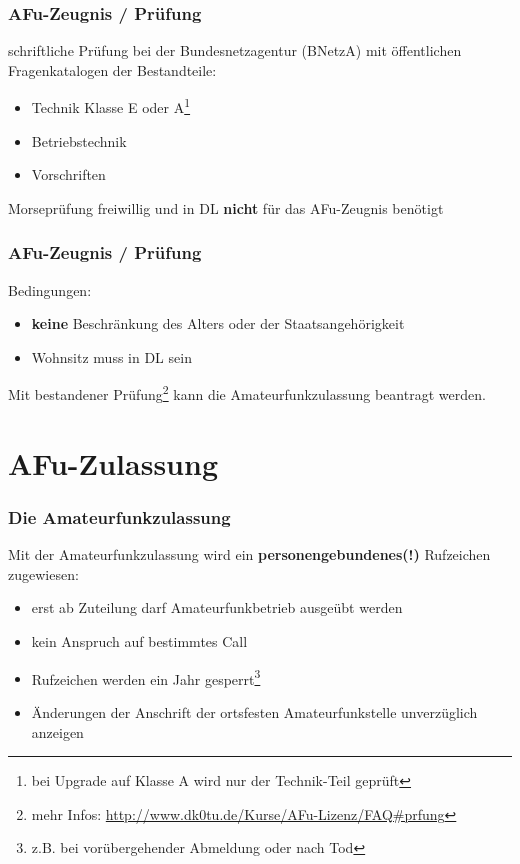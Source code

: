 \begin{frame}
  \frametitle{AFu-Zeugnis / Prüfung}

  schriftliche Prüfung bei der Bundesnetzagentur (BNetzA) mit öffentlichen
  Fragenkatalogen der Bestandteile:

  \begin{itemize}
    \item Technik Klasse E oder A\footnote{bei Upgrade auf Klasse A wird nur
      der Technik-Teil geprüft}
    \item Betriebstechnik
    \item Vorschriften
  \end{itemize}

  \vspace{2em}

  Morseprüfung freiwillig und in DL \textbf{nicht} für das AFu-Zeugnis benötigt

\end{frame}

\begin{frame}
  \frametitle{AFu-Zeugnis / Prüfung}

  Bedingungen:

  \begin{itemize}
    \item \textbf{keine} Beschränkung des Alters oder der Staatsangehörigkeit
    \item Wohnsitz muss in DL sein
  \end{itemize}

  Mit bestandener Prüfung\footnote{mehr Infos: \scriptsize
  \url{http://www.dk0tu.de/Kurse/AFu-Lizenz/FAQ\#prfung}} kann die
  Amateurfunkzulassung beantragt werden.

\end{frame}

\section{AFu-Zulassung}

\begin{frame}
  \frametitle{Die Amateurfunkzulassung}

  Mit der Amateurfunkzulassung wird ein \textbf{personengebundenes(!)}
  Rufzeichen zugewiesen:

  \begin{itemize}
    \item erst ab Zuteilung darf Amateurfunkbetrieb ausgeübt werden
    \item kein Anspruch auf bestimmtes Call
    \item Rufzeichen werden ein Jahr gesperrt\footnote{z.B. bei
      vorübergehender Abmeldung oder nach Tod}
    \item Änderungen der Anschrift der ortsfesten Amateurfunkstelle
      unverzüglich anzeigen
  \end{itemize}

\end{frame}

